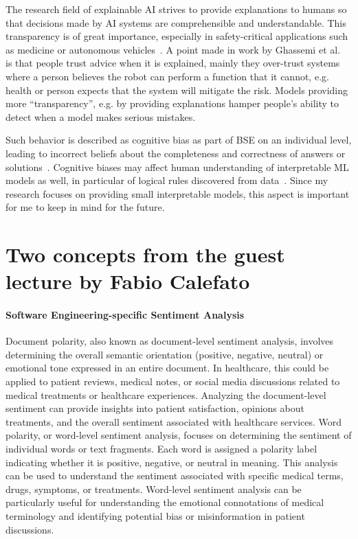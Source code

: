 \documentclass[11pt,runningheads]{article}
\begin{document}
The research field of explainable AI strives to provide explanations to humans so that decisions made by AI systems are comprehensible and understandable. This transparency is of great importance, especially in safety-critical applications such as medicine or autonomous vehicles~\cite{doshivelez2017rigorous}. A point made in work by Ghassemi et al.~\cite{ghassemi2021false} is that people trust advice when it is explained, mainly they over-trust systems where a person believes the robot can perform a function that it cannot, e.g. health or person expects that the system will mitigate the risk. Models providing more “transparency”, e.g. by providing explanations hamper people’s ability to detect when a model makes serious mistakes. 

Such behavior is described as cognitive bias as part of BSE on an individual level, leading to incorrect beliefs about the completeness and correctness of answers or solutions~\cite{bertrand2022cognitive}. Cognitive biases may affect human understanding of interpretable ML models as well, in particular of logical rules discovered from data~\cite{kliegr2021review}. Since my research focuses on providing small interpretable models, this aspect is important for me to keep in mind for the future. 


\section{Two concepts from the guest lecture by Fabio Calefato} 
\paragraph{Software Engineering-specific Sentiment Analysis}
Document polarity, also known as document-level sentiment analysis, involves determining the overall semantic orientation (positive, negative, neutral)  or emotional tone expressed in an entire document. In healthcare, this could be applied to patient reviews, medical notes, or social media discussions related to medical treatments or healthcare experiences. Analyzing the document-level sentiment can provide insights into patient satisfaction, opinions about treatments, and the overall sentiment associated with healthcare services.
Word polarity, or word-level sentiment analysis, focuses on determining the sentiment of individual words or text fragments. Each word is assigned a polarity label indicating whether it is positive, negative, or neutral in meaning. This analysis can be used to understand the sentiment associated with specific medical terms, drugs, symptoms, or treatments. Word-level sentiment analysis can be particularly useful for understanding the emotional connotations of medical terminology and identifying potential bias or misinformation in patient discussions.
\end{document}
